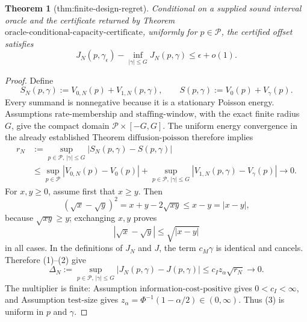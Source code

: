 \documentclass{article}
\newtheorem{theorem}{Theorem}
\begin{document}
\begin{theorem}[thm:finite-design-regret]\label{thm:finite-design-regret}
Conditional on a supplied sound interval oracle and the certificate returned by Theorem \(\mathrm{oracle\mbox{-}conditional\mbox{-}capacity\mbox{-}certificate}\), uniformly for \(p\in\mathcal P\), the certified offset satisfies
\[
 J_N(p,\gamma_\epsilon)-\inf_{|\gamma|\leq G}J_N(p,\gamma)
 \leq\epsilon+o(1).
\]
\end{theorem}
\begin{proof}
Define
\[
 S_N(p,\gamma):=V_{0,N}(p)+V_{1,N}(p,\gamma),
 \qquad S(p,\gamma):=V_0(p)+V_\gamma(p).
\]
Every summand is nonnegative because it is a stationary Poisson energy.  Assumptions \(\mathrm{rate\mbox{-}membership}\) and \(\mathrm{staffing\mbox{-}window}\), with the exact finite radius \(G\), give the compact domain \(\mathcal P\times[-G,G]\).  The uniform energy convergence in the already established Theorem \(\mathrm{diffusion\mbox{-}poisson}\) therefore implies
\[
 \begin{aligned}
 r_N&:=\sup_{p\in\mathcal P,\,|\gamma|\leq G}
 |S_N(p,\gamma)-S(p,\gamma)|\\
 &\leq\sup_{p\in\mathcal P}|V_{0,N}(p)-V_0(p)|
 +\sup_{p\in\mathcal P,\,|\gamma|\leq G}
 |V_{1,N}(p,\gamma)-V_\gamma(p)|
 \longrightarrow0.
 \end{aligned}
\tag{1}
\]
For \(x,y\geq0\), assume first that \(x\geq y\).  Then
\[
 (\sqrt x-\sqrt y)^2=x+y-2\sqrt{xy}\leq x-y=|x-y|,
\]
because \(\sqrt{xy}\geq y\); exchanging \(x,y\) proves
\[
 |\sqrt x-\sqrt y|\leq\sqrt{|x-y|}
\tag{2}
\]
in all cases.  In the definitions of \(J_N\) and \(J\), the term \(c_M\gamma\) is identical and cancels.  Therefore (1)--(2) give
\[
 \Delta_N:=\sup_{p\in\mathcal P,\,|\gamma|\leq G}
 |J_N(p,\gamma)-J(p,\gamma)|
 \leq c_Iz_\alpha\sqrt{r_N}\longrightarrow0.
\tag{3}
\]
The multiplier is finite: Assumption \(\mathrm{information\mbox{-}cost\mbox{-}positive}\) gives \(0<c_I<\infty\), and Assumption \(\mathrm{test\mbox{-}size}\) gives \(z_\alpha=\Phi^{-1}(1-\alpha/2)\in(0,\infty)\).  Thus (3) is uniform in \(p\) and \(\gamma\).


\end{proof}
\end{document}

